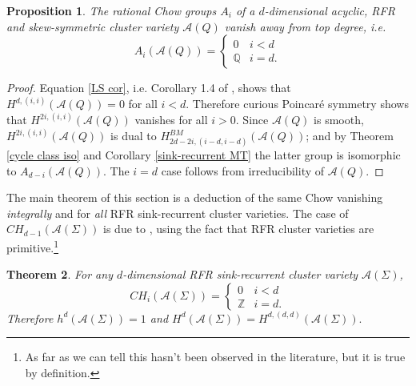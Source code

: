 \documentclass[11pt]{amsart}
\newtheorem{thm}{Theorem}[section]
\newtheorem{prop}[thm]{Proposition}
\theoremstyle{definition}
\theoremstyle{remark}
\numberwithin{equation}{section}
\begin{document}
\begin{prop}
    The rational Chow groups $A_i$ of a $d$-dimensional acyclic, RFR and skew-symmetric cluster variety $\mathcal{A}(Q)$ vanish away from top degree, i.e. \begin{equation}
        A_i(\mathcal{A}(Q)) = \begin{cases}  0 & i < d \\
    \mathbb{Q} & i = d.
   \end{cases}
    \end{equation}
\end{prop}

\begin{proof}
    Equation \ref{LS cor}, i.e. Corollary 1.4 of \cite{LSII}, shows that $H^{d, (i, i)}(\mathcal{A}(Q)) = 0$ for all $i < d$. Therefore curious Poincar\'e symmetry shows that $H^{2i, (i, i)}(\mathcal{A}(Q))$ vanishes for all $i > 0$. Since $\mathcal{A}(Q)$ is smooth, $H^{2i, (i, i)}(\mathcal{A}(Q))$ is dual to $H_{2d -2i, (i - d, i - d)}^{BM}(\mathcal{A}(Q))$; and by Theorem \ref{cycle class iso} and Corollary \ref{sink-recurrent MT} the latter group is isomorphic to $A_{d-i}(\mathcal{A}(Q))$. The $i = d$ case follows from irreducibility of $\mathcal{A}(Q)$.
\end{proof}

The main theorem of this section is a deduction of the same Chow vanishing \textit{integrally} and for \textit{all} RFR sink-recurrent cluster varieties. The case of $CH_{d-1}(\mathcal{A}(\Sigma))$ is due to \cite{cao2024valuation}, using the fact that RFR cluster varieties are primitive.\footnote{As far as we can tell this hasn't been observed in the literature, but it is true by definition.}

\begin{thm}\label{chow/cohom theorem}
    For any $d$-dimensional RFR sink-recurrent cluster variety $\mathcal{A}(\Sigma)$,
     \begin{equation}
        CH_i(\mathcal{A}(\Sigma)) = \begin{cases}  0 & i < d \\
    \mathbb{Z} & i = d.
   \end{cases} \end{equation} Therefore $h^d(\mathcal{A}(\Sigma)) = 1$ and $
    H^d(\mathcal{A}(\Sigma)) = H^{d, (d, d)}(\mathcal{A}(\Sigma)).$
\end{thm}
\end{document}
